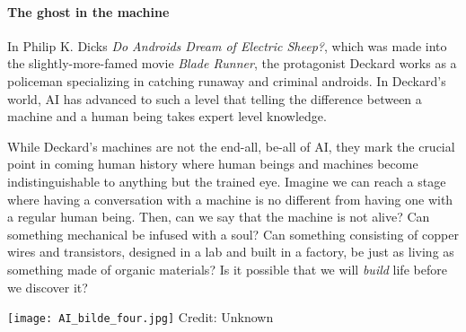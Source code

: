 
\paragraph{The ghost in the machine}

In Philip K. Dicks \emph{Do Androids Dream of Electric Sheep?}, which was made into the slightly-more-famed movie \emph{Blade Runner}, the protagonist Deckard works as a policeman specializing in catching runaway and criminal androids. In Deckard's world, AI has advanced to such a level that telling the difference between a machine and a human being takes expert level knowledge.

While Deckard's machines are not the end-all, be-all of AI, they mark the crucial point in coming human history where human beings and machines become indistinguishable to anything but the trained eye.
Imagine we can reach a stage where having a conversation with a machine is no different from having one with a regular human being.
Then, can we say that the machine is not alive?
Can something mechanical be infused with a soul?
Can something consisting of copper wires and transistors, designed in a lab and built in a factory, be just as living as something made of organic materials?
Is it possible that we will \emph{build} life before we discover it?

\begin{center}
	\texttt{[image: AI\_bilde\_four.jpg]}
	\tiny{Credit: Unknown}
\end{center}

